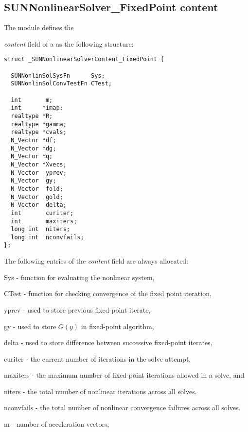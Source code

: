 \subsection{SUNNonlinearSolver\_FixedPoint content}
\label{ss:sunnonlinsolfixedpoint_content}

The {\sunnonlinsolfixedpoint} module defines the {\textit{content} field of a
 as the following structure:
\begin{verbatim}
struct _SUNNonlinearSolverContent_FixedPoint {

  SUNNonlinSolSysFn      Sys;
  SUNNonlinSolConvTestFn CTest;

  int       m;
  int      *imap;
  realtype *R;
  realtype *gamma;
  realtype *cvals;
  N_Vector *df;
  N_Vector *dg;
  N_Vector *q;
  N_Vector *Xvecs;
  N_Vector  yprev;
  N_Vector  gy;
  N_Vector  fold;
  N_Vector  gold;
  N_Vector  delta;
  int       curiter;
  int       maxiters;
  long int  niters;
  long int  nconvfails;
};
\end{verbatim}
The following entries of the \emph{content} field are always
allocated:
\begin{args}[nconvfails]
  \item[Sys]        - function for evaluating the nonlinear system,
  \item[CTest]      - function for checking convergence of the fixed point iteration,
  \item[yprev]      -  used to store previous fixed-point iterate,
  \item[gy]         -  used to store $G(y)$ in fixed-point algorithm,
  \item[delta]      -  used to store difference between successive fixed-point iterates,
  \item[curiter]    - the current number of iterations in the solve attempt,
  \item[maxiters]   - the maximum number of fixed-point iterations allowed in
                      a solve, and
  \item[niters]     - the total number of nonlinear iterations across all
                      solves.
  \item[nconvfails] - the total number of nonlinear convergence failures across
                      all solves.
  \item[m]          - number of acceleration vectors,
\end{args}
\vspace{1em}

}
